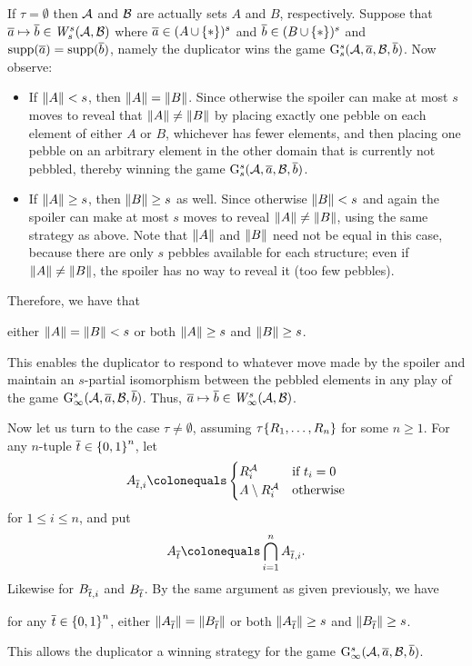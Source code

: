 \begin{enumerate}[1.]
If $\tau = \emptyset$ then $\mathcal{A}$ and $\mathcal{B}$ are actually sets $A$ and $B$, respectively. Suppose that $\vect{a} \mapsto \vect{b} \in \winpos[s]{s}(\strct{A}, \strct{B})$ where $\overline{a} \in (A \mathop{\cup} {\{\ast\}})^{s}$ and $\overline{b} \in (B \mathop{\cup} {\{\ast\}})^{s}$ and $\mathrm{supp}(\overline{a}) = \mathrm{supp}(\overline{b})$, namely the duplicator wins the game $\game[s]{s}(\strct{A}, \vect{a}, \strct{B}, \vect{b})$. Now observe:
\begin{itemize}
\item If $\|A\| < s$, then $\|A\| = \|B\|$. Since otherwise the spoiler can make at most $s$ moves to reveal that $\|A\| \neq \|B\|$ by placing exactly one pebble on each element of either $A$ or $B$, whichever has fewer elements, and then placing one pebble on an arbitrary element in the other domain that is currently not pebbled, thereby winning the game $\game[s]{s}(\strct{A}, \vect{a}, \strct{B}, \vect{b})$.
\item If $\|A\| \geq s$, then $\|B\| \geq s$ as well. Since otherwise $\|B\| < s$ and again the spoiler can make at most $s$ moves to reveal $\|A\| \neq \|B\|$, using the same strategy as above. Note that $\|A\|$ and $\|B\|$ need not be equal in this case, because there are only $s$ pebbles available for each structure; even if $\|A\| \neq \|B\|$, the spoiler has no way to reveal it (too few pebbles).
\end{itemize}
Therefore, we have that
\begin{center}
either $\|A\| = \|B\| < s$ or both $\|A\| \geq s$ and $\|B\| \geq s$.
\end{center}
This enables the duplicator to respond to whatever move made by the spoiler and maintain an $s$-partial isomorphism between the pebbled elements in any play of the game $\game[s]{\infty}(\strct{A}, \vect{a}, \strct{B}, \vect{b})$. Thus, $\vect{a} \mapsto \vect{b} \in \winpos[s]{\infty}(\strct{A}, \strct{B})$.

Now let us turn to the case $\tau \neq \emptyset$, assuming $\tau {\{R_1, \ldots, R_n\}}$ for some $n \geq 1$. For any $n$-tuple $\overline{t} \in {\{0, 1\}}^{n}$, let
\[
A_{\vect{t}, i} \defas \begin{cases}
\intpr{R_i}{\strct{A}} & \mbox{if \mathmode{t_i = 0}}\cr
A \setminus \intpr{R_i}{\strct{A}} & \mbox{otherwise}\cr
\end{cases}
\]
for $1 \leq i \leq n$, and put
\[
A_{\vect{t}} \defas \bintsc^n_{i = 1} A_{\vect{t}, i}.
\]
Likewise for $B_{\overline{t}, i}$ and $B_{\overline{t}}$. By the same argument as given previously, we have
\begin{center}
for any $\overline{t} \in {\{0, 1\}}^{n}$, either $\|A_{\overline{t}}\| = \|B_{\overline{t}}\|$ or both $\|A_{\overline{t}}\| \geq s$ and $\|B_{\overline{t}}\| \geq s$.
\end{center}
This allows the duplicator a winning strategy for the game $\game[s]{\infty}(\strct{A}, \vect{a}, \strct{B}, \vect{b})$.


\end{enumerate}

